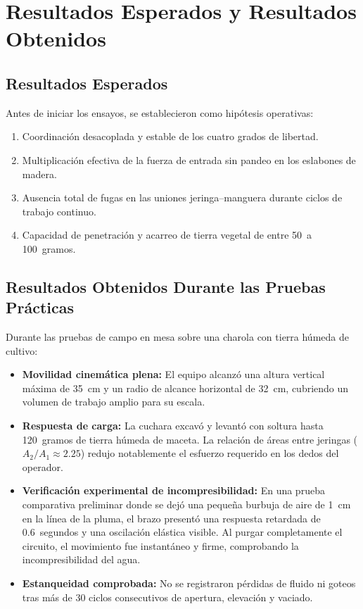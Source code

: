 \section{Resultados Esperados y Resultados Obtenidos}
\subsection{Resultados Esperados}
Antes de iniciar los ensayos, se establecieron como hipótesis operativas:
\begin{enumerate}
    \item Coordinación desacoplada y estable de los cuatro grados de libertad.
    \item Multiplicación efectiva de la fuerza de entrada sin pandeo en los eslabones de madera.
    \item Ausencia total de fugas en las uniones jeringa--manguera durante ciclos de trabajo continuo.
    \item Capacidad de penetración y acarreo de tierra vegetal de entre \SI{50}{a} \SI{100}{gramos}.
\end{enumerate}

\subsection{Resultados Obtenidos Durante las Pruebas Prácticas}
Durante las pruebas de campo en mesa sobre una charola con tierra húmeda de cultivo:
\begin{itemize}
    \item \textbf{Movilidad cinemática plena:} El equipo alcanzó una altura vertical máxima de \SI{35}{cm} y un radio de alcance horizontal de \SI{32}{cm}, cubriendo un volumen de trabajo amplio para su escala.
    \item \textbf{Respuesta de carga:} La cuchara excavó y levantó con soltura hasta \SI{120}{gramos} de tierra húmeda de maceta. La relación de áreas entre jeringas ($A_2/A_1 \approx 2.25$) redujo notablemente el esfuerzo requerido en los dedos del operador.
    \item \textbf{Verificación experimental de incompresibilidad:} En una prueba comparativa preliminar donde se dejó una pequeña burbuja de aire de \SI{1}{cm} en la línea de la pluma, el brazo presentó una respuesta retardada de \SI{0.6}{segundos} y una oscilación elástica visible. Al purgar completamente el circuito, el movimiento fue instantáneo y firme, comprobando la incompresibilidad del agua.
    \item \textbf{Estanqueidad comprobada:} No se registraron pérdidas de fluido ni goteos tras más de 30 ciclos consecutivos de apertura, elevación y vaciado.
\end{itemize}

